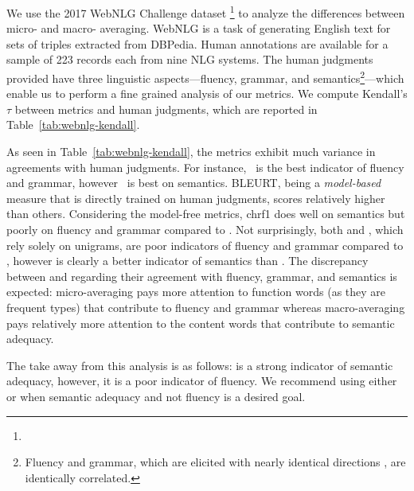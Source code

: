 We use the 2017 WebNLG Challenge dataset \cite{gardent2017webNLG-corpus, shimorina2018webnlg-human-eval}\footnote{} to analyze the differences between micro- and macro- averaging. 
WebNLG is a task of generating English text for sets of triples extracted from DBPedia.
Human annotations are available for a sample of 223 records each from nine NLG systems.
The human judgments provided have three linguistic aspects---fluency, grammar, and semantics\footnote{Fluency and grammar, which are elicited with nearly identical directions \cite{gardent2017webNLG-corpus}, are identically correlated.}---which enable us to perform a fine grained analysis of our metrics.
We compute Kendall's $\tau$ between metrics and human judgments, which are reported in Table~\ref{tab:webnlg-kendall}.

As seen in Table~\ref{tab:webnlg-kendall}, the metrics exhibit much variance in agreements with human judgments. %
For instance, \blrtmd\ is the best indicator of fluency and grammar, however \blrtmn\ is best on semantics. 
BLEURT, being a \textit{model-based} measure that is directly trained on human judgments, scores relatively higher than others.
Considering the model-free metrics, chrf1 does well on semantics but poorly on fluency and grammar compared to \bleu.
Not surprisingly, both  and , which rely solely on unigrams, are poor indicators of fluency and grammar compared to \bleu, however  is clearly a better indicator of semantics than \bleu. 
The discrepancy between  and  regarding their agreement with fluency, grammar, and semantics is expected: micro-averaging pays more attention to function words (as they are frequent types) that contribute to fluency and grammar whereas macro-averaging pays relatively more attention to the content words that contribute to semantic adequacy. 

The take away from this analysis is as follows:  is a strong indicator of semantic adequacy, however, it is a poor indicator of fluency. We recommend using either  or  when semantic adequacy and not fluency is a desired goal.



